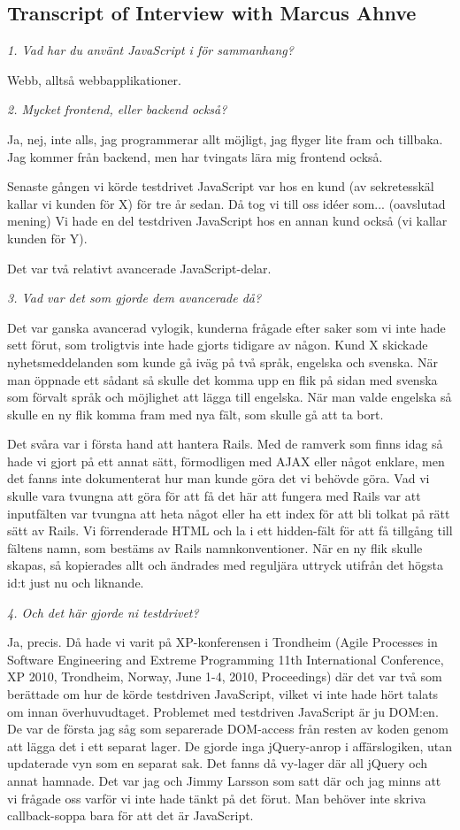 \documentclass[11pt]{article}
\begin{document}
\subsection{Transcript of Interview with Marcus Ahnve}

\emph{1. Vad har du använt JavaScript i för sammanhang?}

Webb, alltså webbapplikationer.

\emph{2. Mycket frontend, eller backend också?}

Ja, nej, inte alls, jag programmerar allt möjligt, jag flyger lite fram och tillbaka. Jag kommer från backend, men har tvingats lära mig frontend också.

Senaste gången vi körde testdrivet JavaScript var hos en kund (av sekretesskäl kallar vi kunden för X) för tre år sedan. Då tog vi till oss idéer som... (oavslutad mening) Vi hade en del testdriven JavaScript hos en annan kund också (vi kallar kunden för Y).

Det var två relativt avancerade JavaScript-delar.

\emph{3. Vad var det som gjorde dem avancerade då?}

Det var ganska avancerad vylogik, kunderna frågade efter saker som vi inte hade sett förut, som troligtvis inte hade gjorts tidigare av någon. Kund X skickade nyhetsmeddelanden som kunde gå iväg på två språk, engelska och svenska. När man öppnade ett sådant så skulle det komma upp en flik på sidan med svenska som förvalt språk och möjlighet att lägga till engelska. När man valde engelska så skulle en ny flik komma fram med nya fält, som skulle gå att ta bort.

Det svåra var i första hand att hantera Rails. Med de ramverk som finns idag så hade vi gjort på ett annat sätt, förmodligen med AJAX eller något enklare, men det fanns inte dokumenterat hur man kunde göra det vi behövde göra. Vad vi skulle vara tvungna att göra för att få det här att fungera med Rails var att inputfälten var tvungna att heta något eller ha ett index för att bli tolkat på rätt sätt av Rails. Vi förrenderade HTML och la i ett hidden-fält för att få tillgång till fältens namn, som bestäms av Rails namnkonventioner. När en ny flik skulle skapas, så kopierades allt och ändrades med reguljära uttryck utifrån det högsta id:t just nu och liknande.

\emph{4. Och det här gjorde ni testdrivet?}

Ja, precis. Då hade vi varit på XP-konferensen i Trondheim (Agile Processes in Software Engineering and Extreme Programming 11th International Conference, XP 2010, Trondheim, Norway, June 1-4, 2010, Proceedings) där det var två som berättade om hur de körde testdriven JavaScript, vilket vi inte hade hört talats om innan överhuvudtaget. Problemet med testdriven JavaScript är ju DOM:en. De var de första jag såg som separerade DOM-access från resten av koden genom att lägga det i ett separat lager. De gjorde inga jQuery-anrop i affärslogiken, utan updaterade vyn som en separat sak. Det fanns då vy-lager där all jQuery och annat hamnade. Det var jag och Jimmy Larsson som satt där och jag minns att vi frågade oss varför vi inte hade tänkt på det förut. Man behöver inte skriva callback-soppa bara för att det är JavaScript.
\end{document}
